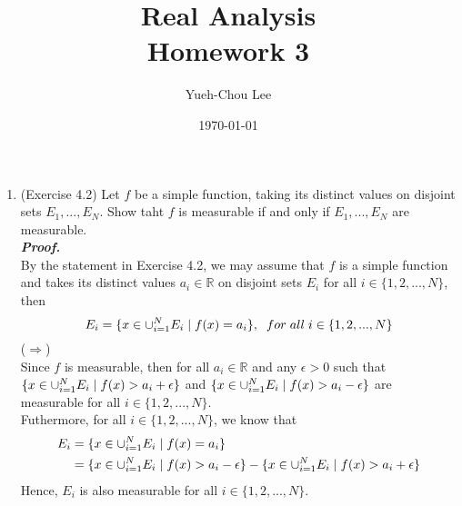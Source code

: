 \documentclass[a4paper,11pt]{article}
\title{Real Analysis \\ Homework 3}
\author{Yueh-Chou Lee}
\date{\today}
\begin{document}
\maketitle
\begin{enumerate}

\item (Exercise 4.2)
Let $f$ be a simple function, taking its distinct values on disjoint sets $E_1, ..., E_N$. Show taht $f$ is measurable if and only if $E_1, ..., E_N$ are measurable.\\
\newline
\textit{\textbf {Proof.}}\\
By the statement in Exercise 4.2, we may assume that $f$ is a simple function and takes its distinct values $a_i \in \mathbb{R}$ on disjoint sets $E_i$ for all $i \in \{ 1,2,...,N \}$, then
$$E_i = \{ x \in \cup_{i=1}^{N} E_i \hspace{0.1cm} | \hspace{0.1cm} f(x) = a_i \},
\hspace{0.2 cm} \mathnormal{for} \hspace{0.1cm} \mathnormal{all} \hspace{0.1cm} i \in \{ 1,2,...,N \}$$
($\Rightarrow$)\\
Since $f$ is measurable, then for all $a_i \in \mathbb{R}$ and any $\epsilon > 0$ such that
$\{ x \in  \cup_{i=1}^{N} E_i \hspace{0.1cm} | \hspace{0.1cm} f(x) > a_i + \epsilon \}$
and
$\{ x \in  \cup_{i=1}^{N} E_i \hspace{0.1cm} | \hspace{0.1cm} f(x) > a_i - \epsilon \}$
are measurable for all $i \in \{ 1,2,...,N \}$.\\
Futhermore, for all $i \in \{ 1,2,...,N \}$, we know that 
$$\begin{aligned}
E_i
&= \{ x \in \cup_{i=1}^{N} E_i \hspace{0.1cm} | \hspace{0.1cm} f(x) = a_i \}\\
&= \{ x \in  \cup_{i=1}^{N} E_i \hspace{0.1cm} | \hspace{0.1cm} f(x) > a_i - \epsilon \}
- \{ x \in  \cup_{i=1}^{N} E_i \hspace{0.1cm} | \hspace{0.1cm} f(x) > a_i + \epsilon \}
\end{aligned}$$
Hence, $E_i$ is also measurable for all $i \in \{ 1,2,...,N \}$.\\


\end{enumerate}
\end{document}
